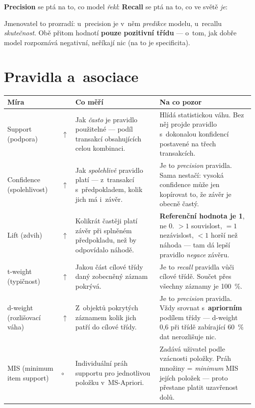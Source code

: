 \documentclass[11pt,a4paper]{article}
\makeatletter
\newcommand{\up}{\textcolor{upcol}{$\boldsymbol{\uparrow}$}}
\newcommand{\neut}{$\circ$}
\newenvironment{mirytab}{%
  \par\medskip\noindent\small
  \begin{tabular}{@{}>{\raggedright\arraybackslash}p{3.15cm}
                    >{\centering\arraybackslash}p{0.85cm}
                    >{\raggedright\arraybackslash}p{5.3cm}
                    >{\raggedright\arraybackslash}p{6.1cm}@{}}
  \toprule
  \textbf{Míra} & & \textbf{Co měří} & \textbf{Na co pozor} \\
  \midrule}%
  {\bottomrule\end{tabular}\par\medskip}
\makeatother
\begin{document}
\begin{poznbox}
\small
\textbf{Precision} se ptá na to, co model \emph{řekl}:  \quad
\textbf{Recall} se ptá na to, co ve světě \emph{je}: 

Jmenovatel to prozradí: u~precision je v~něm \emph{predikce} modelu, u~recallu
\emph{skutečnost}. Obě přitom hodnotí \textbf{pouze pozitivní třídu} --- o~tom, jak dobře
model rozpoznává negativní, neříkají nic (na to je specificita).
\end{poznbox}

\section{Pravidla a~asociace}

\begin{mirytab}
Support (podpora) & \up &
Jak \emph{často} je pravidlo použitelné --- podíl transakcí obsahujících celou kombinaci. &
Hlídá statistickou váhu. Bez něj projde pravidlo s~dokonalou konfidencí postavené
na třech transakcích. \\[2pt]

Confidence \newline (spolehlivost) & \up &
Jak \emph{spolehlivě} pravidlo platí --- z~transakcí s~předpokladem, kolik jich má
i~závěr. &
Je to \emph{precision} pravidla. Sama nestačí: vysoká confidence může jen kopírovat to,
že závěr je obecně častý. \\[2pt]

Lift (zdvih) & \up &
Kolikrát častěji platí závěr při splněném předpokladu, než by odpovídalo náhodě. &
\textbf{Referenční hodnota je 1}, ne 0. $>1$ souvislost, $=1$ nezávislost,
$<1$ horší než náhoda --- tam dá lepší pravidlo \emph{negace} závěru. \\[2pt]

t-weight \newline (typičnost) & \up &
Jakou část cílové třídy daný zobecněný záznam pokrývá. &
Je to \emph{recall} pravidla vůči cílové třídě. Součet přes všechny záznamy je 100~\%. \\[2pt]

d-weight \newline (rozlišovací váha) & \up &
Z~objektů pokrytých záznamem kolik jich patří do cílové třídy. &
Je to \emph{precision} pravidla. Vždy srovnat s~\textbf{apriorním} podílem třídy ---
d-weight 0,6 při třídě zabírající 60~\% dat nerozlišuje nic. \\[2pt]

MIS \newline (minimum item support) & \neut &
Individuální práh supportu pro jednotlivou položku v~MS-Apriori. &
Zadává uživatel podle vzácnosti položky. Práh množiny = \emph{minimum} MIS jejích položek
--- proto přestane platit uzavřenost dolů. \\
\end{mirytab}
\end{document}
